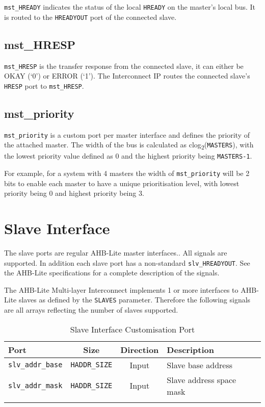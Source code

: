 \texttt{mst\_HREADY} indicates the status of the local \texttt{HREADY} on the master's
local bus. It is routed to the \texttt{HREADYOUT} port of the connected slave.

\subsection{mst\_HRESP}\label{mst_hresp}

\texttt{mst\_HRESP} is the transfer response from the connected slave, it can
either be OKAY (`0') or ERROR (`1'). The Interconnect IP routes the
connected slave's \texttt{HRESP} port to \texttt{mst\_HRESP}.

\subsection{mst\_priority}\label{mst_priority}

\texttt{mst\_priority} is a custom port per master interface and defines the priority
of the attached master. The width of the bus is calculated as clog\textsubscript{2}(\texttt{MASTERS}), with the lowest priority value defined as 0 and the  highest priority being \texttt{MASTERS-1}.

For example, for a system with 4 masters the width of \texttt{mst\_priority} will be
2 bits to enable each master to have a unique prioritisation level, with lowest priority being 0 and highest priority being 3.

\section{Slave Interface}\label{slave-interface}

The slave ports are regular AHB-Lite master interfaces.. All signals are
supported. In addition each slave port has a non-standard
\texttt{slv\_HREADYOUT}. See the AHB-Lite specifications for a complete
description of the signals.

The AHB-Lite Multi-layer Interconnect implements 1 or more interfaces to AHB-Lite slaves
as defined by the \texttt{SLAVES} parameter. Therefore the following signals are all
arrays reflecting the number of slaves supported.

\begin{longtable}[]{@{}lccl@{}}
\toprule
Port & Size & Direction & Description\tabularnewline
\midrule
\endhead
\texttt{slv\_addr\_base} & \texttt{HADDR\_SIZE} & Input  & Slave base address\tabularnewline
\texttt{slv\_addr\_mask} & \texttt{HADDR\_SIZE} & Input  & Slave address space mask\tabularnewline
\bottomrule
\caption{Slave Interface Customisation Port}
\end{longtable}

